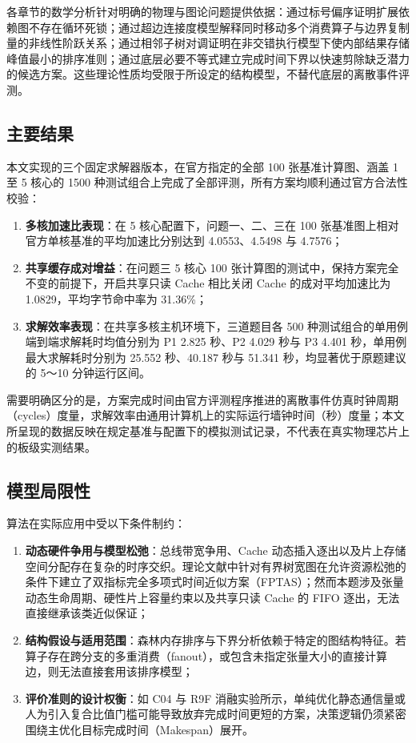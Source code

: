 \documentclass[anonymous,withtoc]{gmcm2026}
\providecommand{\tightlist}{\setlength{\itemsep}{0pt}\setlength{\parskip}{0pt}}
\begin{document}
各章节的数学分析针对明确的物理与图论问题提供依据：通过标号偏序证明扩展依赖图不存在循环死锁；通过超边连接度模型解释同时移动多个消费算子与边界复制量的非线性阶跃关系；通过相邻子树对调证明在非交错执行模型下使内部结果存储峰值最小的排序准则；通过底层必要不等式建立完成时间下界以快速剪除缺乏潜力的候选方案。这些理论性质均受限于所设定的结构模型，不替代底层的离散事件评测。

\subsection{主要结果}

本文实现的三个固定求解器版本，在官方指定的全部 100 张基准计算图、涵盖 1 至 5 核心的 1500 种测试组合上完成了全部评测，所有方案均顺利通过官方合法性校验：

\begin{enumerate}
\def\labelenumi{\arabic{enumi}.}
\tightlist
\item
  \textbf{多核加速比表现}：在 5 核心配置下，问题一、二、三在 100 张基准图上相对官方单核基准的平均加速比分别达到 4.0553、4.5498 与 4.7576；
\item
  \textbf{共享缓存成对增益}：在问题三 5 核心 100 张计算图的测试中，保持方案完全不变的前提下，开启共享只读 Cache 相比关闭 Cache 的成对平均加速比为 1.0829，平均字节命中率为 31.36\%；
\item
  \textbf{求解效率表现}：在共享多核主机环境下，三道题目各 500 种测试组合的单用例端到端求解耗时均值分别为 P1 2.825 秒、P2 4.029 秒与 P3 4.401 秒，单用例最大求解耗时分别为 25.552 秒、40.187 秒与 51.341 秒，均显著优于原题建议的 5～10 分钟运行区间。
\end{enumerate}

需要明确区分的是，方案完成时间由官方评测程序推进的离散事件仿真时钟周期（cycles）度量，求解效率由通用计算机上的实际运行墙钟时间（秒）度量；本文所呈现的数据反映在规定基准与配置下的模拟测试记录，不代表在真实物理芯片上的板级实测结果。

\subsection{模型局限性}

算法在实际应用中受以下条件制约：

\begin{enumerate}
\def\labelenumi{\arabic{enumi}.}
\tightlist
\item
  \textbf{动态硬件争用与模型松弛}：总线带宽争用、Cache 动态插入逐出以及片上存储空间分配存在复杂的时序交织。理论文献中针对有界树宽图在允许资源松弛的条件下建立了双指标完全多项式时间近似方案（FPTAS）\cite{ref11}；然而本题涉及张量动态生命周期、硬性片上容量约束以及共享只读 Cache 的 FIFO 逐出，无法直接继承该类近似保证；
\item
  \textbf{结构假设与适用范围}：森林内存排序与下界分析依赖于特定的图结构特征。若算子存在跨分支的多重消费（fanout），或包含未指定张量大小的直接计算边，则无法直接套用该排序模型；
\item
  \textbf{评价准则的设计权衡}：如 C04 与 R9F 消融实验所示，单纯优化静态通信量或人为引入复合比值门槛可能导致放弃完成时间更短的方案，决策逻辑仍须紧密围绕主优化目标完成时间（Makespan）展开。
\end{enumerate}
\end{document}

